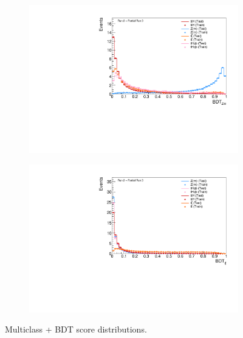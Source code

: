 \begin{figure}[htbp]
  \begin{subfigure}[b]{0.49\textwidth}
    \centering
    \includegraphics[width=\textwidth]{images/plots_tH_tHqb_for_thesis/BDTScore_bkgZ_ATLAS.pdf}
    \caption{}
    \label{fig:bdtscore_bkgZ}
  \end{subfigure}
  \hfill
  \begin{subfigure}[b]{0.49\textwidth}
    \centering
    \includegraphics[width=\textwidth]{images/plots_tH_tHqb_for_thesis/BDTScore_bkgtt_ATLAS.pdf}
    \caption{}
    \label{fig:bdtscore_bkgtt}
  \end{subfigure}

  \caption{Multiclass \thqb + \ttH BDT score distributions.}
  \label{highpt_scores}
\end{figure}



